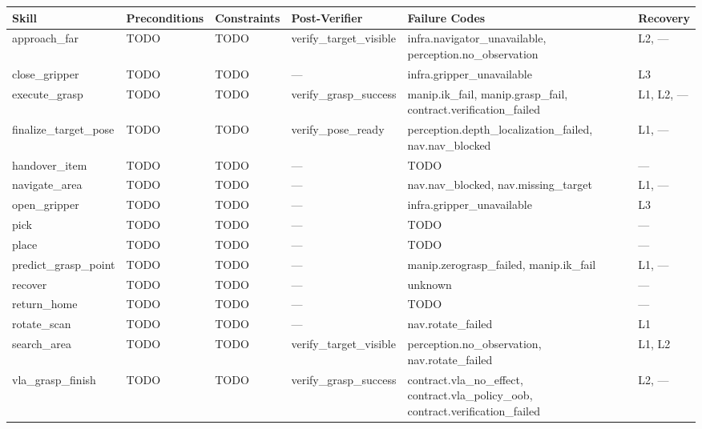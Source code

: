 \begin{tabular}{llllll}
\textbf{Skill} & \textbf{Preconditions} & \textbf{Constraints} & \textbf{Post-Verifier} & \textbf{Failure Codes} & \textbf{Recovery} \\ \hline
approach\_far & TODO & TODO & verify\_target\_visible & infra.navigator\_unavailable, perception.no\_observation & L2, — \\
close\_gripper & TODO & TODO & — & infra.gripper\_unavailable & L3 \\
execute\_grasp & TODO & TODO & verify\_grasp\_success & manip.ik\_fail, manip.grasp\_fail, contract.verification\_failed & L1, L2, — \\
finalize\_target\_pose & TODO & TODO & verify\_pose\_ready & perception.depth\_localization\_failed, nav.nav\_blocked & L1, — \\
handover\_item & TODO & TODO & — & TODO & — \\
navigate\_area & TODO & TODO & — & nav.nav\_blocked, nav.missing\_target & L1, — \\
open\_gripper & TODO & TODO & — & infra.gripper\_unavailable & L3 \\
pick & TODO & TODO & — & TODO & — \\
place & TODO & TODO & — & TODO & — \\
predict\_grasp\_point & TODO & TODO & — & manip.zerograsp\_failed, manip.ik\_fail & L1, — \\
recover & TODO & TODO & — & unknown & — \\
return\_home & TODO & TODO & — & TODO & — \\
rotate\_scan & TODO & TODO & — & nav.rotate\_failed & L1 \\
search\_area & TODO & TODO & verify\_target\_visible & perception.no\_observation, nav.rotate\_failed & L1, L2 \\
vla\_grasp\_finish & TODO & TODO & verify\_grasp\_success & contract.vla\_no\_effect, contract.vla\_policy\_oob, contract.verification\_failed & L2, — \\
\end{tabular}
